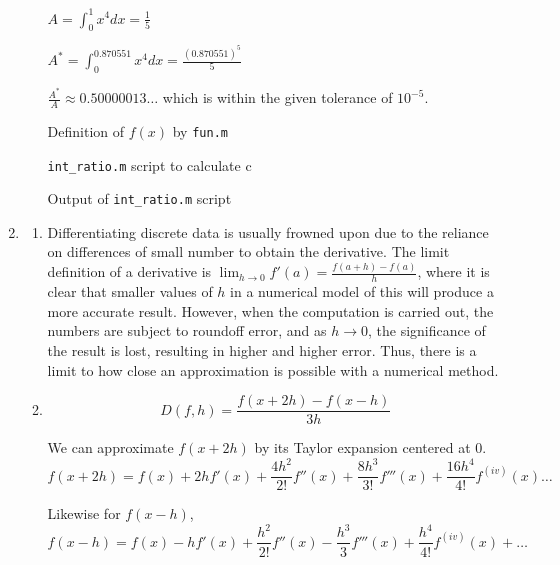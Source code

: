 \documentclass[11pt]{article}
\begin{document}
\begin{enumerate}
\begin{enumerate}[(a)]
		$A = \int_{0}^{1}x^4dx = \frac{1}{5}$

		$A^* = \int_{0}^{0.870551}x^4dx = \frac{(0.870551)^5}{5}$

		$\frac{A^*}{A} \approx 0.50000013\ldots$ which is within the given tolerance of $10^{-5}$.

		\medskip

		\begin{center}
		Definition of $f(x)$ by \texttt{fun.m}
		\end{center}
		

		\medskip

		\begin{center}
		\texttt{int\_ratio.m} script to calculate c
		\end{center}
		

		\medskip

		\begin{center}
		Output of \texttt{int\_ratio.m} script
		\end{center}
		

		\medskip

	\end{enumerate}

	\item

	\begin{enumerate}

		\item Differentiating discrete data is usually frowned upon due to the reliance on differences of small number to obtain the derivative. The limit definition of a derivative is $\lim_{h\to0}f'(a) = \frac{f(a+h)-f(a)}{h}$, where it is clear that smaller values of $h$ in a numerical model of this will produce a more accurate result. However, when the computation is carried out, the numbers are subject to roundoff error, and as $h\to0$, the significance of the result is lost, resulting in higher and higher error. Thus, there is a limit to how close an approximation is possible with a numerical method.

		\medskip

		\item \[D(f,h) = \frac{f(x+2h) - f(x-h)}{3h}\]

		We can approximate $f(x+2h)$ by its Taylor expansion centered at 0.
		\[
		f(x+2h) = f(x) + 2hf'(x) + \frac{4h^2}{2!}f''(x) + \frac{8h^3}{3!}f'''(x) + \frac{16h^4}{4!}f^{(iv)}(x)\ldots
		\]

		Likewise for $f(x-h)$,
		\[
		f(x-h) = f(x) - hf'(x) + \frac{h^2}{2!}f''(x) - \frac{h^3}{3}f'''(x) + \frac{h^4}{4!}f^{(iv)}(x) + \ldots
		\]


\end{enumerate}
\end{enumerate}
\end{document}
